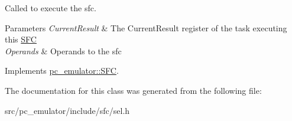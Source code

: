 Called to execute the sfc. 


\begin{DoxyParams}{Parameters}
{\em Current\+Result} & The Current\+Result register of the task executing this \hyperlink{classpc__emulator_1_1SFC}{S\+FC} \\
\hline
{\em Operands} & Operands to the sfc \\
\hline
\end{DoxyParams}


Implements \hyperlink{classpc__emulator_1_1SFC_ab206c80fc0e429c56672b4f6a0ca8635}{pc\+\_\+emulator\+::\+S\+FC}.



The documentation for this class was generated from the following file\+:\begin{DoxyCompactItemize}
\item 
src/pc\+\_\+emulator/include/sfc/sel.\+h\end{DoxyCompactItemize}
